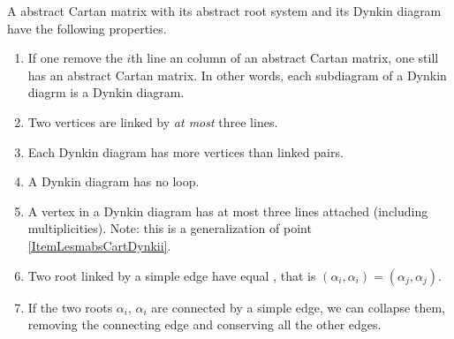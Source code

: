 \begin{lemma}   \label{LesmabsCartDynk}
    A abstract Cartan matrix with its abstract root system and its Dynkin diagram have the following properties.
    \begin{enumerate}
        \item\label{ItemLesmabsCartDynki}
            If one remove the \( i\)th line an column of an abstract Cartan matrix, one still has an abstract Cartan matrix. In other words, each subdiagram of a Dynkin diagrm is a Dynkin diagram.
        \item\label{ItemLesmabsCartDynkii}
            Two vertices are linked by \emph{at most} three lines.
        \item\label{ItemLesmabsCartDynkiii}
            Each Dynkin diagram has more vertices than linked pairs.
        \item\label{ItemLesmabsCartDynkiv}
            A Dynkin diagram has no loop.
        \item\label{ItemLesmabsCartDynkv}
            A vertex in a Dynkin diagram has at most three lines attached (including multiplicities). Note: this is a generalization of point \ref{ItemLesmabsCartDynkii}.
        \item\label{ItemLesmabsCartDynkvi}
            Two root linked by a simple edge have equal , that is \( (\alpha_i,\alpha_i)=(\alpha_j,\alpha_j)\).
        \item\label{ItemLesmabsCartDynkvii}
            If the two roots \( \alpha_i\), \( \alpha_i\) are connected by a simple edge, we can collapse them, removing the connecting edge and conserving all the other edges.

    \end{enumerate}
\end{lemma}

